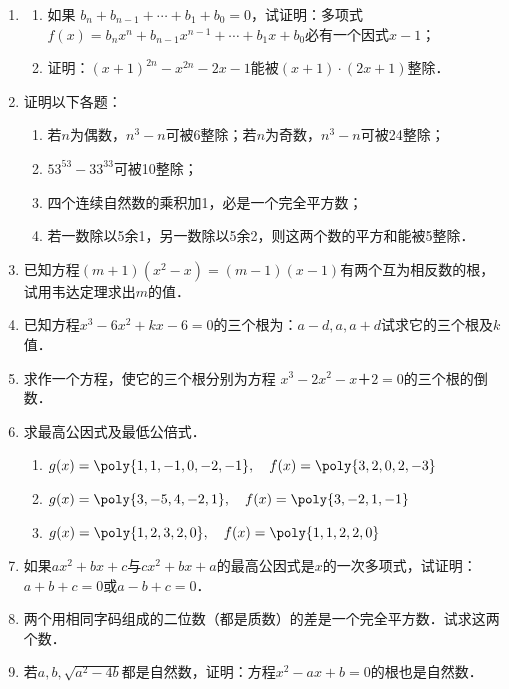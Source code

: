 \begin{enumerate}
\item 
\begin{enumerate}
\item 如果 $b_n+b_{n-1}+\cdots+b_1+b_0=0$，试证明：多项式$f(x)=b_nx^n+b_{n-1}x^{n-1}+\cdots+b_1x+b_0$必有一个因式$x-1$；
\item 证明：$(x+1)^{2n}-x^{2n}-2x-1$能被$(x+1)\cdot (2x+1)$整除．
\end{enumerate}

\item 证明以下各题：
\begin{enumerate}
    \item 若$n$为偶数，$n^3-n$可被6整除；若$n$为奇数，$n^3-n$可被24整除；
    \item $53^{53}-33^{33}$可被10整除；
    \item 四个连续自然数的乘积加1，必是一个完全平方数；
    \item 若一数除以5余1，另一数除以5余2，则这两个数的平方和能被5整除．
\end{enumerate}

\item 已知方程$(m+1)(x^2-x)=(m-1)(x-1)$有两个互为相反数的根，试用韦达定理求出$m$的值．
\item 已知方程$x^3-6x^2+kx-6=0$的三个根为：$a-d,a,a+d$试求它的三个根及$k$值．
\item 求作一个方程，使它的三个根分别为方程 $x^3-2x^2-x＋2=0$的三个根的倒数．

\item 求最高公因式及最低公倍式．
\begin{enumerate}
    \item $g(x)=\poly{1,1,-1,0,-2,-1},\quad f(x)=\poly{3,2,0,2,-3}$
    \item $g(x)=\poly{3,-5,4,-2,1},\quad f(x)=\poly{3,-2,1,-1}$
    \item $g(x)=\poly{1,2,3,2,0},\quad f(x)=\poly{1,1,2,2,0}$
\end{enumerate}


\item 如果$ax^2+bx+c$与$cx^2+bx+a$的最高公因式是$x$的一次多项式，试证明：
$a+b+c=0$或$a-b+c=0$．
\item 两个用相同字码组成的二位数（都是质数）的差是一个完全平方数．试求这两个数．
\item 若$a,b,\sqrt{a^2-4b}$都是自然数，证明：方程$x^2-ax+b=0$的根也是自然数．

\end{enumerate}

